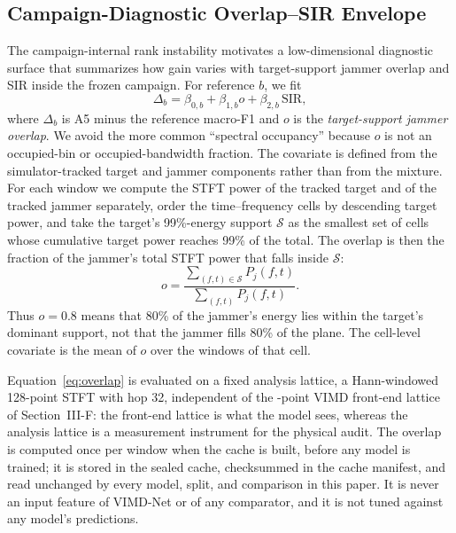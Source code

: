 \documentclass[letterpaper,journal]{IEEEtran}
\begin{document}
\subsection{Campaign-Diagnostic Overlap--SIR Envelope}
The campaign-internal rank instability motivates a low-dimensional diagnostic
surface that summarizes how
gain varies with target-support jammer overlap and SIR inside the frozen
campaign. For reference $b$, we fit
\begin{equation}
\Delta_b=\beta_{0,b}+\beta_{1,b}o+\beta_{2,b}\,\mathrm{SIR},
\label{eq:envelope}
\end{equation}
where $\Delta_b$ is A5 minus the reference macro-F1 and $o$ is the
\emph{target-support jammer overlap}. We avoid the more common ``spectral
occupancy'' because $o$ is not an occupied-bin or occupied-bandwidth fraction.
The covariate is defined from the simulator-tracked target and jammer
components rather than from the mixture. For each window we compute the STFT
power of the tracked target and of the tracked jammer separately, order the
time--frequency cells by descending target power, and take the target's
99\%-energy support $\mathcal{S}$ as the smallest set of cells whose cumulative
target power reaches 99\% of the total. The overlap is then the fraction of the
jammer's total STFT power that falls inside $\mathcal{S}$:
\begin{equation}
o=\frac{\sum_{(f,t)\in\mathcal{S}}P_j(f,t)}{\sum_{(f,t)}P_j(f,t)}.
\label{eq:overlap}
\end{equation}
Thus $o=0.8$ means that 80\% of the jammer's energy lies within the target's
dominant support, not that the jammer fills 80\% of the plane. The cell-level
covariate is the mean of $o$ over the windows of that cell.

Equation~\eqref{eq:overlap} is evaluated on a fixed analysis lattice, a
Hann-windowed 128-point STFT with hop 32, independent of the
\NFft-point VIMD front-end lattice of Section~III-F: the front-end lattice is
what the model sees, whereas the analysis lattice is a measurement instrument
for the physical audit. The overlap is computed once per window when the cache
is built, before any model is trained; it is stored in the sealed cache,
checksummed in the cache manifest, and read unchanged by every model, split,
and comparison in this paper. It is never an
input feature of VIMD-Net or of any comparator, and it is not tuned against any
model's predictions.
\end{document}
